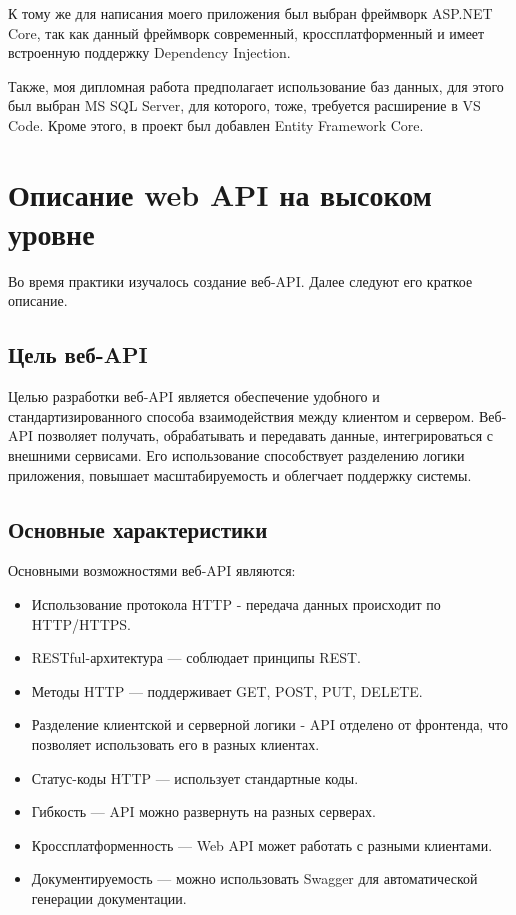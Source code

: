 \documentclass[a4paper,12pt]{report}
\begin{document}
К тому же для написания моего приложения был выбран фреймворк ASP.NET Core, так как данный фреймворк современный, 
кроссплатформенный и имеет встроенную поддержку Dependency Injection.

Также, моя дипломная работа предполагает использование баз данных, для этого был выбран MS SQL Server, для которого, тоже, требуется расширение в VS Code. 
Кроме этого, в проект был добавлен  Entity Framework Core.

\section{Описание web API на высоком уровне}

Во время практики изучалось создание веб-API. Далее следуют его краткое описание.

\subsection{Цель веб-API}

Целью разработки веб-API является обеспечение удобного и стандартизированного способа взаимодействия между клиентом и сервером. 
Веб-API позволяет получать, обрабатывать и передавать данные, интегрироваться с внешними сервисами. 
Его использование способствует разделению логики приложения, повышает масштабируемость и облегчает поддержку системы.

\subsection{Основные характеристики}

Основными возможностями веб-API являются:
\begin{itemize}
  \item
      Использование протокола HTTP - передача данных происходит по HTTP/HTTPS.
  \item
      RESTful-архитектура --- соблюдает принципы REST.
  \item
      Методы HTTP --- поддерживает GET, POST, PUT, DELETE.
  \item
      Разделение клиентской и серверной логики - API отделено от фронтенда, что позволяет использовать его в разных клиентах.
  \item
      Статус-коды HTTP --- использует стандартные коды.
  \item
      Гибкость --- API можно развернуть на разных серверах.
  \item
      Кроссплатформенность --- Web API может работать с разными клиентами.
  \item
      Документируемость --- можно использовать Swagger для автоматической генерации документации.
\end{itemize}
\end{document}

